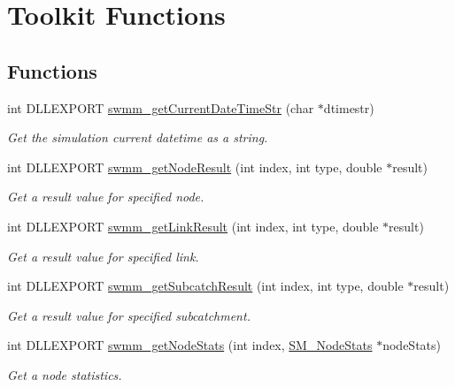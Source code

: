 \hypertarget{group__tkfuncs}{}\section{Toolkit Functions}
\label{group__tkfuncs}
\subsection*{Functions}
\begin{DoxyCompactItemize}
\item 
int D\+L\+L\+E\+X\+P\+O\+RT \mbox{\hyperlink{group__tkfuncs_ga1035b4f45546c1c90da4dafda7e3677d}{swmm\+\_\+get\+Current\+Date\+Time\+Str}} (char $\ast$dtimestr)
\begin{DoxyCompactList}\small\item\em Get the simulation current datetime as a string. \end{DoxyCompactList}\item 
int D\+L\+L\+E\+X\+P\+O\+RT \mbox{\hyperlink{group__tkfuncs_gacef44d121a8f9a646f4e6f108b494373}{swmm\+\_\+get\+Node\+Result}} (int index, int type, double $\ast$result)
\begin{DoxyCompactList}\small\item\em Get a result value for specified node. \end{DoxyCompactList}\item 
int D\+L\+L\+E\+X\+P\+O\+RT \mbox{\hyperlink{group__tkfuncs_ga578a49668d519c8b4cdcab2227f8119b}{swmm\+\_\+get\+Link\+Result}} (int index, int type, double $\ast$result)
\begin{DoxyCompactList}\small\item\em Get a result value for specified link. \end{DoxyCompactList}\item 
int D\+L\+L\+E\+X\+P\+O\+RT \mbox{\hyperlink{group__tkfuncs_ga32311167c22094c1eb9aa69edee29d63}{swmm\+\_\+get\+Subcatch\+Result}} (int index, int type, double $\ast$result)
\begin{DoxyCompactList}\small\item\em Get a result value for specified subcatchment. \end{DoxyCompactList}\item 
int D\+L\+L\+E\+X\+P\+O\+RT \mbox{\hyperlink{group__tkfuncs_ga0d52d8f1b900a0ef3d3df309c5df21f8}{swmm\+\_\+get\+Node\+Stats}} (int index, \mbox{\hyperlink{struct_s_m___node_stats}{S\+M\+\_\+\+Node\+Stats}} $\ast$node\+Stats)
\begin{DoxyCompactList}\small\item\em Get a node statistics. \end{DoxyCompactList}\item 

\end{DoxyCompactItemize}
